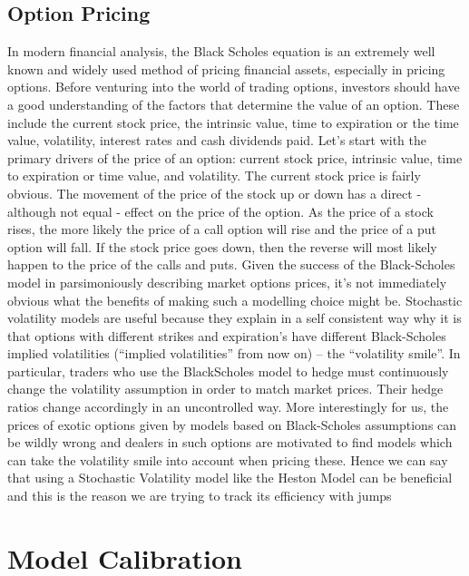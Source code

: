 \documentclass{article}
\begin{document}
\subsection{Option Pricing}
In modern financial analysis, the Black Scholes equation is an extremely well known and widely used method of pricing financial assets, especially in pricing options. Before venturing into the world of trading options, investors should have a good understanding of the factors that determine the value of an option. These include the current stock price, the intrinsic value, time to expiration or the time value, volatility, interest rates and cash dividends paid. Let's start with the primary drivers of the price of an option: current stock price, intrinsic value, time to expiration or time value, and volatility. The current stock price is fairly obvious. The movement of the price of the stock up or down has a direct - although not equal - effect on the price of the option. As the price of a stock rises, the more likely the price of a call option will rise and the price of a put option will fall. If the stock price goes down, then the reverse will most likely happen to the price of the calls and puts. \citep{ref9} 
\newline\newline
Given the success of the Black-Scholes model in parsimoniously describing market options prices, it’s not immediately obvious what the benefits of making such a modelling choice might be. Stochastic volatility models are useful because they explain in a self consistent way why it is that options with different strikes and expiration's have different Black-Scholes implied volatilities (“implied volatilities” from now on) – the “volatility smile”. In particular, traders who use the BlackScholes model to hedge must continuously change the volatility assumption in order to match market prices. Their hedge ratios change accordingly in an uncontrolled way. More interestingly for us, the prices of exotic options given by models based on Black-Scholes assumptions can be wildly wrong and dealers in such options are motivated to find models which can take the volatility smile into account when pricing these.\citep{ref6} Hence we can say that using a Stochastic Volatility model like the Heston Model can be beneficial and this is the reason we are trying to track its efficiency with jumps



\section{Model Calibration}
\end{document}

